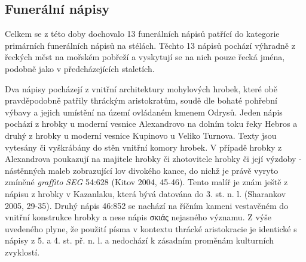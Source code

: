 
\subsection[funerální-nápisy-4]{Funerální nápisy}

Celkem se z této doby dochovalo 13 funerálních nápisů patřící do kategorie primárních funerálních nápisů na stélách. Těchto 13 nápisů pochází výhradně z řeckých měst na mořském pobřeží a vyskytují se na nich pouze řecká jména, podobně jako v předcházejících staletích.

Dva nápisy pocházejí z vnitřní architektury mohylových hrobek, které obě pravděpodobně patřily thráckým aristokratům, soudě dle bohaté pohřební výbavy a jejich umístění na území ovládaném kmenem Odrysů. Jeden nápis pochází z hrobky u moderní vesnice Alexandrovo na dolním toku řeky Hebros a druhý z hrobky u moderní vesnice Kupinovo u Veliko Turnova. Texty jsou vytesány či vyškrábány do stěn vnitřní komory hrobek. V případě hrobky z Alexandrova poukazují na majitele hrobky či zhotovitele hrobky či její výzdoby - nástěnných maleb zobrazující lov divokého kance, do nichž je právě vyryto zmíněné {\em graffito} {\em SEG} 54:628 (Kitov 2004, 45-46). Tento malíř je znám ještě z nápisu z hrobky v Kazanlaku, která bývá datována do 3. st. n. l. (Sharankov 2005, 29-35). Druhý nápis 46:852 se nachází na říčním kameni vestavěném do vnitřní konstrukce hrobky a nese nápis σκιάς nejasného významu. Z výše uvedeného plyne, že použití písma v kontextu thrácké aristokracie je identické s nápisy z 5. a 4. st. př. n. l. a nedochází k zásadním proměnám kulturních zvyklostí.

